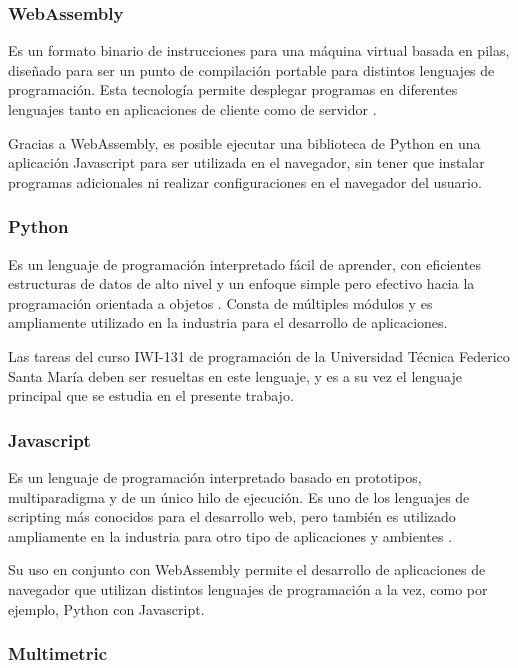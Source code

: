 \documentclass[letterpaper,12pt]{article}
\begin{document}
\subsubsection{WebAssembly}

Es un formato binario de instrucciones para una máquina virtual basada en pilas, diseñado para ser un punto de compilación portable para distintos lenguajes de programación. Esta tecnología permite desplegar programas en diferentes lenguajes tanto en aplicaciones de cliente como de servidor \cite{WebAssemblyCoreSpecification2}.

Gracias a WebAssembly, es posible ejecutar una biblioteca de Python en una aplicación Javascript para ser utilizada en el navegador, sin tener que instalar programas adicionales ni realizar configuraciones en el navegador del usuario.

\subsubsection{Python}

Es un lenguaje de programación interpretado fácil de aprender, con eficientes estructuras de datos de alto nivel y un enfoque simple pero efectivo hacia la programación orientada a objetos \cite{PythonWebsite}. Consta de múltiples módulos y es ampliamente utilizado en la industria para el desarrollo de aplicaciones.

Las tareas del curso IWI-131 de programación de la Universidad Técnica Federico Santa María deben ser resueltas en este lenguaje, y es a su vez el lenguaje principal que se estudia en el presente trabajo.

\subsubsection{Javascript}

Es un lenguaje de programación interpretado basado en prototipos, multiparadigma y de un único hilo de ejecución. Es uno de los lenguajes de scripting más conocidos para el desarrollo web, pero también es utilizado ampliamente en la industria para otro tipo de aplicaciones y ambientes \cite{MDNJavaScript}.

Su uso en conjunto con WebAssembly permite el desarrollo de aplicaciones de navegador que utilizan distintos lenguajes de programación a la vez, como por ejemplo, Python con Javascript.

\subsubsection{Multimetric}
\end{document}
